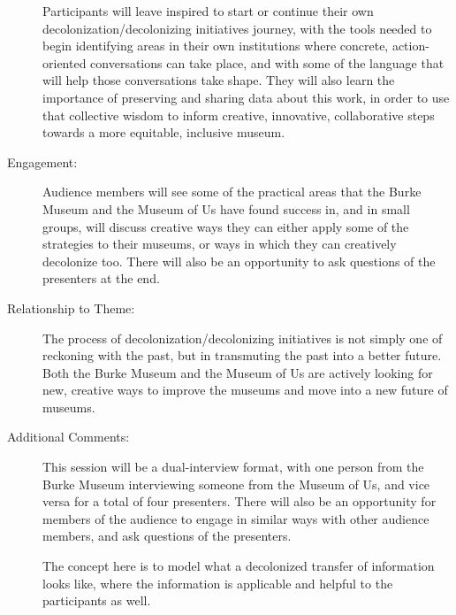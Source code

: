 \documentclass{report}
\begin{document}
\begin{description}
Participants will leave inspired to start or continue their own decolonization/decolonizing initiatives journey, with the tools needed to begin identifying areas in their own institutions where concrete, action-oriented conversations can take place, and with some of the language that will help those conversations take shape. They will also learn the importance of preserving and sharing data about this work, in order to use that collective wisdom to inform creative, innovative, collaborative steps towards a more equitable, inclusive museum.
							    \item [Engagement:]Audience members will see some of the practical areas that the Burke Museum and the Museum of Us have found success in, and in small groups, will discuss creative ways they can either apply some of the strategies to their museums, or ways in which they can creatively decolonize too. There will also be an opportunity to ask questions of the presenters at the end.
							    \item [Relationship to Theme:]The process of decolonization/decolonizing initiatives is not simply one of reckoning with the past, but in transmuting the past into a better future. Both the Burke Museum and the Museum of Us are actively looking for new, creative ways to improve the museums and move into a new future of museums.
							    
                    \item [Additional Comments: ]This session will be a dual-interview format, with one person from the Burke Museum interviewing someone from the Museum of Us, and vice versa for a total of four presenters. There will also be an opportunity for members of the audience to engage in similar ways with other audience members, and ask questions of the presenters. 

The concept here is to model what a decolonized transfer of information looks like, where the information is applicable and helpful to the participants as well. 

                \end{description}
\end{document}
